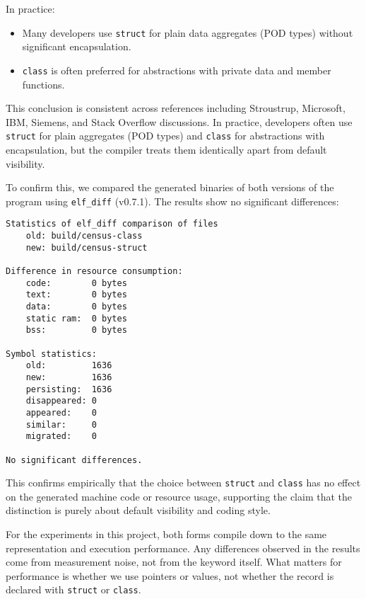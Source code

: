 \documentclass[11pt,letterpaper,oneside]{article}
\begin{document}
In practice:
\begin{itemize}
    \item Many developers use \texttt{struct} for plain data aggregates (POD
    types) without significant encapsulation.
    \item \texttt{class} is often preferred for abstractions with private data
    and member functions.
\end{itemize}

This conclusion is consistent across references including Stroustrup, Microsoft,
IBM, Siemens, and Stack Overflow discussions. In practice, developers often use
\texttt{struct} for plain aggregates (POD types) and \texttt{class} for
abstractions with encapsulation, but the compiler treats them identically apart
from default visibility.

To confirm this, we compared the generated binaries of both versions of the
program using \texttt{elf\_diff} (v0.7.1). The results show no significant
differences:

\begin{lstlisting}[caption={\texttt{elf\_diff} comparison of binaries built with \texttt{class} vs. \texttt{struct}}]
Statistics of elf_diff comparison of files
    old: build/census-class
    new: build/census-struct

Difference in resource consumption:
    code:        0 bytes
    text:        0 bytes
    data:        0 bytes
    static ram:  0 bytes
    bss:         0 bytes

Symbol statistics:
    old:         1636
    new:         1636
    persisting:  1636
    disappeared: 0
    appeared:    0
    similar:     0
    migrated:    0

No significant differences.
\end{lstlisting}

This confirms empirically that the choice between \texttt{struct} and
\texttt{class} has no effect on the generated machine code or resource usage,
supporting the claim that the distinction is purely about default visibility and
coding style.

For the experiments in this project, both forms compile down to the same
representation and execution performance. Any differences observed in the
results come from measurement noise, not from the keyword itself. What matters
for performance is whether we use pointers or values, not whether the record is
declared with \texttt{struct} or \texttt{class}.


\printbibliography
\end{document}
